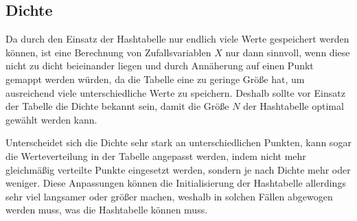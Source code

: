 \subsection{Dichte}
\label{Dichte}
Da durch den Einsatz der Hashtabelle nur endlich viele Werte gespeichert werden können, ist 
eine Berechnung von Zufallsvariablen $X$ nur dann sinnvoll, wenn diese nicht zu dicht 
beieinander liegen und durch Annäherung auf einen Punkt gemappt werden würden, da die Tabelle 
eine zu geringe Größe hat, um ausreichend viele unterschiedliche Werte zu speichern. Deshalb 
sollte vor Einsatz der Tabelle die Dichte bekannt sein, damit die Größe $N$ der 
Hashtabelle optimal gewählt werden kann.

Unterscheidet sich die Dichte sehr stark an unterschiedlichen Punkten, kann sogar die 
Werteverteilung in der Tabelle angepasst werden, indem nicht mehr gleichmäßig verteilte 
Punkte eingesetzt werden, sondern je nach Dichte mehr oder weniger. Diese Anpassungen 
können die Initialisierung der Hashtabelle allerdings sehr viel langsamer oder größer machen, 
weshalb in solchen Fällen abgewogen werden muss, was die Hashtabelle können muss.